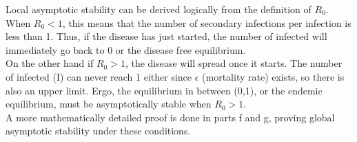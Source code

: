 Local asymptotic stability can be derived logically from the definition of $R_0$. When $R_0 < 1$, this means that the number of secondary infections per infection is less than 1. Thus, if the disease has just started, the number of infected will immediately go back to 0 or the disease free equilibrium.\\
On the other hand if $R_0 > 1$, the disease will spread once it starts. The number of infected (I) can never reach 1 either since $\epsilon$ (mortality rate) exists, so there is also an upper limit. Ergo, the equilibrium in between (0,1), or the endemic equilibrium, must be asymptotically stable when $R_0 > 1$.\\
A more mathematically detailed proof is done in parts f and g, proving global asymptotic stability under these conditions.